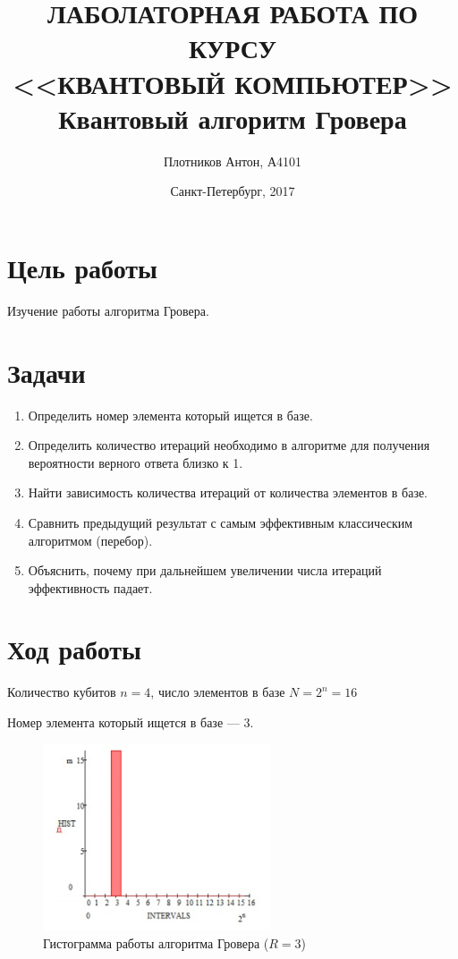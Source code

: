 \documentclass{article}
\title{ЛАБОЛАТОРНАЯ РАБОТА ПО КУРСУ\\ <<КВАНТОВЫЙ КОМПЬЮТЕР>>\\
Квантовый алгоритм Гровера}
\date{Санкт-Петербург, 2017}
\author{Плотников Антон, А4101}
\begin{document}
\maketitle
\newpage

\section{Цель работы}
Изучение работы алгоритма Гровера.

\section{Задачи}

\begin{enumerate}
  \item	Определить номер элемента который ищется в базе.
  \item	Определить количество итераций необходимо в алгоритме для получения
    вероятности верного ответа близко к 1.
  \item	Найти зависимость количества итераций от количества элементов в базе.
  \item	Сравнить предыдущий результат с самым эффективным классическим алгоритмом (перебор).
  \item	Объяснить, почему при дальнейшем увеличении числа итераций эффективность падает.
\end{enumerate}

\section{Ход работы}

Количество кубитов $n = 4$, число элементов в базе $N = 2^n = 16$

Номер элемента который ищется в базе --- 3.

\begin{figure}[H]
  \centering
  \includegraphics[width=0.6\textwidth]{graf_4_1}
  \caption{Гистограмма работы алгоритма Гровера ($R=3$)}\label{fig:41}
\end{figure}
\end{document}
